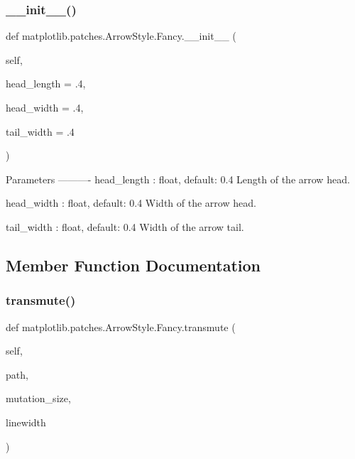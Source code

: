 \subsubsection{\texorpdfstring{\+\_\+\+\_\+init\+\_\+\+\_\+()}{\_\_init\_\_()}}
{\footnotesize\ttfamily def matplotlib.\+patches.\+Arrow\+Style.\+Fancy.\+\_\+\+\_\+init\+\_\+\+\_\+ (\begin{DoxyParamCaption}\item[{}]{self,  }\item[{}]{head\+\_\+length = {\ttfamily .4},  }\item[{}]{head\+\_\+width = {\ttfamily .4},  }\item[{}]{tail\+\_\+width = {\ttfamily .4} }\end{DoxyParamCaption})}

\begin{DoxyVerb}Parameters
----------
head_length : float, default: 0.4
    Length of the arrow head.

head_width : float, default: 0.4
    Width of the arrow head.

tail_width : float, default: 0.4
    Width of the arrow tail.
\end{DoxyVerb}
 

\subsection{Member Function Documentation}
\mbox{\label{classmatplotlib_1_1patches_1_1ArrowStyle_1_1Fancy_a19631b638a21623f1e25d7b1ce7ee4ed}} 
\subsubsection{\texorpdfstring{transmute()}{transmute()}}
{\footnotesize\ttfamily def matplotlib.\+patches.\+Arrow\+Style.\+Fancy.\+transmute (\begin{DoxyParamCaption}\item[{}]{self,  }\item[{}]{path,  }\item[{}]{mutation\+\_\+size,  }\item[{}]{linewidth }\end{DoxyParamCaption})}



